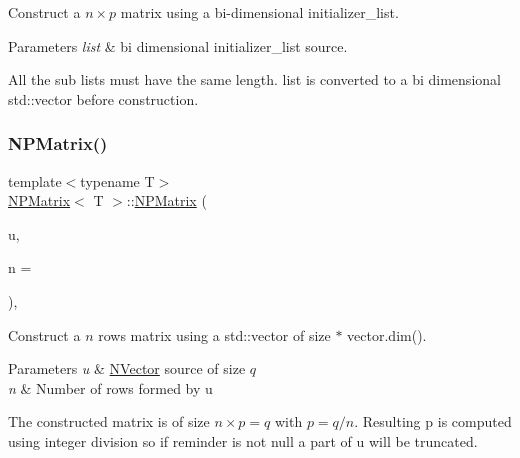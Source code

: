 Construct a $ n \times p $ matrix using a bi-\/dimensional \textquotesingle{}initializer\+\_\+list\textquotesingle{}. 


\begin{DoxyParams}{Parameters}
{\em list} & bi dimensional {\ttfamily initializer\+\_\+list} source.\\
\hline
\end{DoxyParams}
All the sub lists must have the same length. {\ttfamily list} is converted to a bi dimensional {\ttfamily std\+::vector} before construction. \mbox{\label{class_n_p_matrix_a70eca6f9b11e5ab39db67edcba220f34}} 
\subsubsection{\texorpdfstring{NPMatrix()}{NPMatrix()}\hspace{0.1cm}{\footnotesize\ttfamily [5/7]}}
{\footnotesize\ttfamily template$<$typename T$>$ \\
\mbox{\hyperlink{class_n_p_matrix}{N\+P\+Matrix}}$<$ T $>$\+::\mbox{\hyperlink{class_n_p_matrix}{N\+P\+Matrix}} (\begin{DoxyParamCaption}\item[{const \mbox{\hyperlink{class_n_vector}{N\+Vector}}$<$ T $>$ \&}]{u,  }\item[{\mbox{\hyperlink{typedef_8h_a1b140a2034db3f5dfe18a987745df43a}{ul\+\_\+t}}}]{n = {} }\end{DoxyParamCaption})\hspace{0.3cm}{\ttfamily [inline]}, {\ttfamily [explicit]}}



Construct a $ n $ rows matrix using a {\ttfamily std\+::vector} of size { $\ast$ vector.\+dim()}. 


\begin{DoxyParams}{Parameters}
{\em u} & {\ttfamily \mbox{\hyperlink{class_n_vector}{N\+Vector}}} source of size $ q $ \\
\hline
{\em n} & Number of rows formed by u\\
\hline
\end{DoxyParams}
The constructed matrix is of size $ n \times p = q $ with $ p = q / n $. Resulting {\ttfamily p} is computed using integer division so if reminder is not null a part of {\ttfamily u} will be truncated. \mbox{\label{class_n_p_matrix_a844e2c006a3e53ea0d07a35bbe5ffd4e}} 
